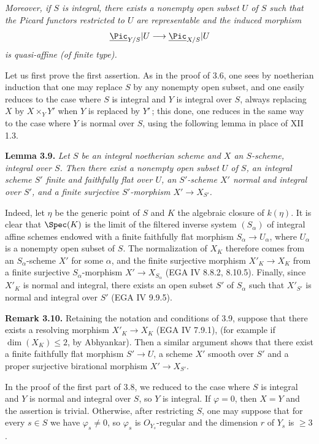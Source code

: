 \emph{Moreover, if \(S\) is integral, there exists a nonempty open subset \(U\) of \(S\) such that the Picard functors restricted to \(U\) are representable and the induced morphism}
\[
\underline{\Pic}_{Y/S}|U\longrightarrow\underline{\Pic}_{X/S}|U
\]
\emph{is quasi-affine (of finite type).}

Let us first prove the first assertion. As in the proof of 3.6, one sees by noetherian induction that one may replace \(S\) by any nonempty open subset, and one easily reduces to the case where \(S\) is integral and \(Y\) is integral over \(S\), always replacing \(X\) by \(X\times_YY'\) when \(Y\) is replaced by \(Y'\)\,; this done, one reduces in the same way to the case where \(Y\) is normal over \(S\), using the following lemma in place of XII 1.3.

\textbf{Lemma 3.9.} \emph{Let \(S\) be an integral noetherian scheme and \(X\) an \(S\)-scheme, integral over \(S\). Then there exist a nonempty open subset \(U\) of \(S\), an integral scheme \(S'\) finite and faithfully flat over \(U\), an \(S'\)-scheme \(X'\) normal and integral over \(S'\), and a finite surjective \(S'\)-morphism \(X'\to X_{S'}\).}

%
Indeed, let \(\eta\) be the generic point of \(S\) and \(K\) the algebraic closure of \(k(\eta)\). It is clear that \(\Spec(K)\) is the limit of the filtered inverse system \((S_\alpha)\) of integral affine schemes endowed with a finite faithfully flat morphism \(S_\alpha\to U_\alpha\), where \(U_\alpha\) is a nonempty open subset of \(S\). The normalization of \(X_K\) therefore comes from an \(S_\alpha\)-scheme \(X'\) for some \(\alpha\), and the finite surjective morphism \(X'_K\to X_K\) from a finite surjective \(S_\alpha\)-morphism \(X'\to X_{S_\alpha}\) (EGA IV 8.8.2, 8.10.5). Finally, since \(X'_K\) is normal and integral, there exists an open subset \(S'\) of \(S_\alpha\) such that \(X'_{S'}\) is normal and integral over \(S'\) (EGA IV 9.9.5).

\textbf{Remark 3.10.} Retaining the notation and conditions of 3.9, suppose that there exists a resolving morphism \(X'_K\to X_K\) (EGA IV 7.9.1), (for example if \(\dim(X_K)\le2\), by Abhyankar). Then a similar argument shows that there exist a finite faithfully flat morphism \(S'\to U\), a scheme \(X'\) smooth over \(S'\) and a proper surjective birational morphism \(X'\to X_{S'}\).

In the proof of the first part of 3.8, we reduced to the case where \(S\) is integral and \(Y\) is normal and integral over \(S\), so \(Y\) is integral. If \(\varphi=0\), then \(X=Y\) and the assertion is trivial. Otherwise, after restricting \(S\), one may suppose that for every \(s\in S\) we have \(\varphi_s\ne0\), so \(\varphi_s\) is \({O}_{Y_s}\)-regular and the dimension \(r\) of \(Y_s\) is \(\ge3\).

